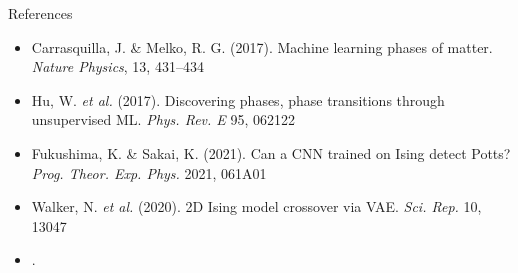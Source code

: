 \documentclass{beamer}
\begin{document}
\begin{frame}{References}
 \begin{itemize}
   \item Carrasquilla, J. \& Melko, R. G. (2017). Machine learning phases of matter. \emph{Nature Physics}, 13, 431–434 
   \item Hu, W. \textit{et al.} (2017). Discovering phases, phase transitions through unsupervised ML. \emph{Phys. Rev. E} 95, 062122 
   \item Fukushima, K. \& Sakai, K. (2021). Can a CNN trained on Ising detect Potts? \emph{Prog. Theor. Exp. Phys.} 2021, 061A01 
   \item Walker, N. \textit{et al.} (2020). 2D Ising model crossover via VAE. \emph{Sci. Rep.} 10, 13047 
   \item [Additional references on PCA, CNN, VAE methods].
 \end{itemize}
\end{frame}
\end{document}

